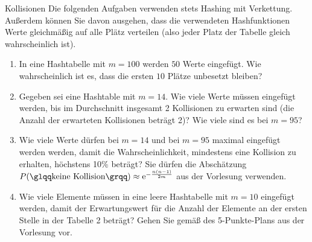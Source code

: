 \documentclass[11pt,a4paper]{article}
\begin{document}
\begin{aufgabe}{2}{Kollisionen}
    Die folgenden Aufgaben verwenden stets Hashing mit Verkettung.
    Außerdem können Sie davon ausgehen, dass die verwendeten Hashfunktionen Werte gleichmäßig auf alle Plätz verteilen (also jeder Platz der Tabelle gleich wahrscheinlich ist).
    \begin{enumerate}
        \item In eine Hashtabelle mit $m = 100$ werden $50$ Werte eingefügt.
        Wie wahrscheinlich ist es, dass die ersten $10$ Plätze unbesetzt bleiben?
        \item Gegeben sei eine Hashtable mit $m = 14$. Wie viele Werte müssen eingefügt werden, bis im Durchschnitt insgesamt 2 Kollisionen zu erwarten sind (die Anzahl der erwarteten Kollisionen beträgt 2)?
        Wie viele sind es bei $m = 95$?
        \item Wie viele Werte dürfen bei $m = 14$ und bei $m = 95$ maximal eingefügt werden werden, damit die Wahrscheinlichkeit, mindestens eine Kollision zu erhalten, höchstens 10\% beträgt?
        Sie dürfen die Abschätzung $P(\text{\quotes{keine Kollision}}) \approx \mathrm{e}^{-\frac{n (n - 1)}{2m}}$ aus der Vorlesung verwenden.
        \item Wie viele Elemente müssen in eine leere Hashtabelle mit $m = 10$ eingefügt werden, damit der Erwartungswert für die Anzahl der Elemente an der ersten Stelle in der Tabelle 2 beträgt?
        Gehen Sie gemäß des \glqq{}5-Punkte-Plans\grqq{} aus der Vorlesung vor.
    \end{enumerate}
\end{aufgabe}
\end{document}
